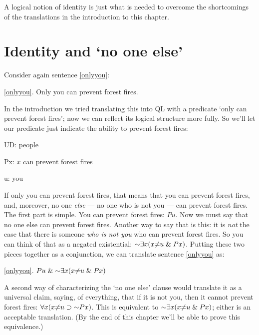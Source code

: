 A logical notion of identity is just what is needed to overcome the shortcomings of the translations in the introduction to this chapter.

\section{Identity and `no one else'}

Consider again sentence \ref{onlyyou}:

\begin{ekey}
\item[\ref{onlyyou}.] Only you can prevent forest fires.
\end{ekey}

In the introduction we tried translating this into QL with a predicate `only  \blank can prevent forest fires'; now we can reflect its logical structure more fully. So we'll let our predicate just indicate the ability to prevent forest fires:

\begin{ekey}
\item[UD:] people
\item[Px:] $x$ can prevent forest fires
\item[u:] you
\end{ekey}

If only you can prevent forest fires, that means that you can prevent forest fires, and, moreover, no one \emph{else} --- no one who is not you --- can prevent forest fires. The first part is simple. You can prevent forest fires: $Pu$. Now we must say that no one else can prevent forest fires. Another way to say that is this: it is \emph{not} the case that there is someone \emph{who is not you} who can prevent forest fires. So you can think of that as a negated existential: $\enot \qt{\exists}{x} (x {\neq} u \eand Px)$. Putting these two pieces together as a conjunction, we can translate sentence \ref{onlyyou} as:

\begin{earg}
\item[\ref{onlyyou}.] $Pu \eand \enot \qt{\exists}{x} (x {\neq} u \eand Px)$
\end{earg}

A second way of characterizing the `no one else' clause would translate it as a universal claim, saying, of everything, that if it is not you, then it cannot prevent forest fires: $\qt{\forall}{x} (x {\neq} u \eif \enot Px)$. This is equivalent to $\enot \qt{\exists}{x} (x {\neq} u \eand Px)$; either is an acceptable translation. (By the end of this chapter we'll be able to prove this equivalence.)

